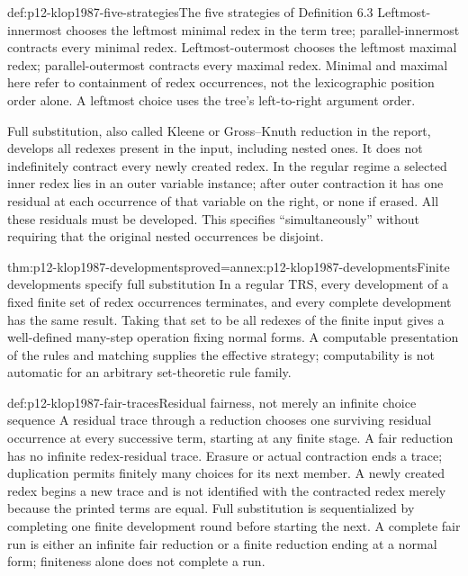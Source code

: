 \begin{hbdefinition}{def:p12-klop1987-five-strategies}{The five strategies of Definition 6.3}
Leftmost-innermost chooses the leftmost minimal redex in the term tree;
parallel-innermost contracts every minimal redex. Leftmost-outermost
chooses the leftmost maximal redex; parallel-outermost contracts every
maximal redex. Minimal and maximal here refer to containment of redex
occurrences, not the lexicographic position order alone. A leftmost
choice uses the tree's left-to-right argument order.

Full substitution, also called Kleene or Gross--Knuth reduction in the
report, develops all redexes present in the input, including nested ones.
It does not indefinitely contract every newly created redex. In the
regular regime a selected inner redex lies in an outer variable instance;
after outer contraction it has one residual at each occurrence of that
variable on the right, or none if erased. All these residuals must be
developed. This specifies ``simultaneously'' without requiring that
the original nested occurrences be disjoint.
\end{hbdefinition}

\begin{hblemma}{thm:p12-klop1987-developments}{proved=annex:p12-klop1987-developments}{Finite developments specify full substitution}
In a regular TRS, every development of a fixed finite set of redex
occurrences terminates, and every complete development has the same result.
Taking that set to be all redexes of the finite input gives a well-defined
many-step operation fixing normal forms. A computable presentation of the
rules and matching supplies the effective strategy; computability is not
automatic for an arbitrary set-theoretic rule family.
\end{hblemma}

\begin{hbdefinition}{def:p12-klop1987-fair-traces}{Residual fairness, not merely an infinite choice sequence}
A residual trace through a reduction chooses one surviving residual
occurrence at every successive term, starting at any finite stage.
A fair reduction has no infinite redex-residual trace. Erasure or actual
contraction ends a trace; duplication permits finitely many choices for
its next member. A newly created redex begins a new trace and is not
identified with the contracted redex merely because the printed terms
are equal. Full substitution is sequentialized by completing one finite
development round before starting the next.
A complete fair run is either an infinite fair reduction or a finite
reduction ending at a normal form; finiteness alone does not complete a run.
\end{hbdefinition}

